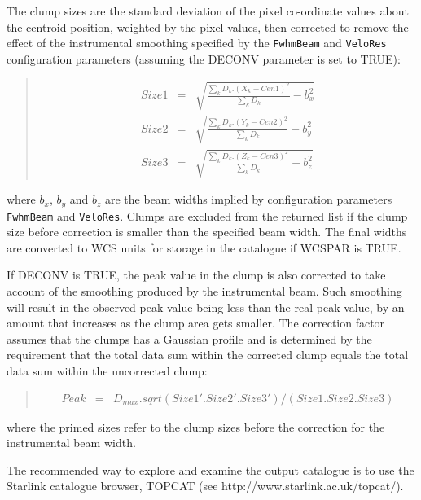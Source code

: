 \documentclass[twoside,11pt]{article}
\newcommand{\htmladdnormallink}[2]{#1}
\renewcommand{\_}{\texttt{\symbol{95}}}
\newenvironment{myquote}{\begin{quote}\begin{small}}{\end{small}\end{quote}}
\begin{document}
The clump sizes are the standard deviation of the pixel co-ordinate values
about the centroid position, weighted by the pixel values, then corrected
to remove the effect of the instrumental smoothing specified by the
{\tt FwhmBeam} and {\tt VeloRes} configuration parameters (assuming the DECONV
parameter is set to TRUE):

\begin{myquote}
\begin{eqnarray*}
  Size1 & = & \sqrt{\frac{\sum_{k}D_{k}.(X_{k}-Cen1)^{2}}{\sum_{k}D_{k}} - b_{x}^{2} } \\
  Size2 & = & \sqrt{\frac{\sum_{k}D_{k}.(Y_{k}-Cen2)^{2}}{\sum_{k}D_{k}} - b_{y}^{2} } \\
  Size3 & = & \sqrt{\frac{\sum_{k}D_{k}.(Z_{k}-Cen3)^{2}}{\sum_{k}D_{k}} - b_{z}^{2} }
\end{eqnarray*}
\end{myquote}

where $b_{x}$, $b_{y}$ and $b_{z}$ are the beam widths implied by
configuration parameters {\tt FwhmBeam} and {\tt VeloRes}. Clumps are excluded
from the returned list if the clump size before correction is smaller than the
specified beam width. The final widths are converted to WCS units for
storage in the catalogue if WCSPAR is TRUE.

If DECONV is TRUE, the peak value in the clump is also corrected to take
account of the smoothing produced by the instrumental beam. Such
smoothing will result in the observed peak value being less than the real
peak value, by an amount that increases as the clump area gets smaller.
The correction factor assumes that the clumps has a Gaussian profile and
is determined by the requirement that the total data sum within the
corrected clump equals the total data sum within the uncorrected clump:

\begin{myquote}
\begin{eqnarray*}
  Peak & = & D_{max}.sqrt{ (Size1'.Size2'.Size3')/(Size1.Size2.Size3)  }
\end{eqnarray*}
\end{myquote}

where the primed sizes refer to the clump sizes before the correction for
the instrumental beam width.

The recommended way to explore and examine the output catalogue is to use
the Starlink catalogue browser, TOPCAT (see
\htmladdnormallink{http://www.starlink.ac.uk/topcat/}
{{\tt http://www.starlink.ac.uk/topcat/}}).
\end{document}
